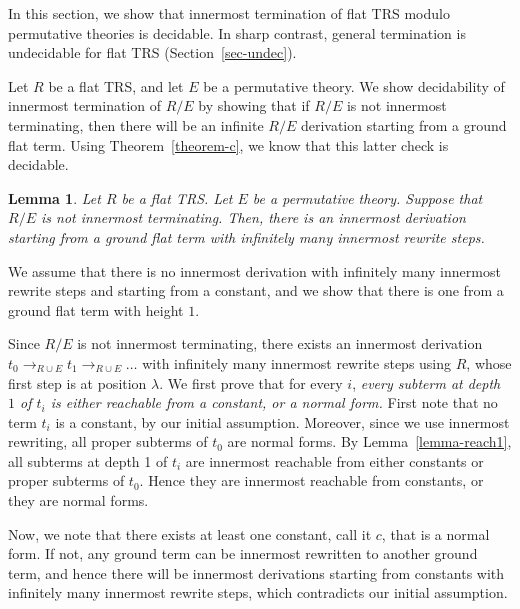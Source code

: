 \documentclass{LMCS}
\theoremstyle{plain}
\newtheorem{lemma}[thm]{Lemma}
\begin{document}
\noindent In this section, we show that innermost termination 
of flat TRS modulo permutative theories is decidable. In sharp contrast,
general termination is undecidable for 
flat TRS (Section~\ref{sec-undec}).

Let $R$ be a flat TRS, and let $E$ be a permutative theory.
We show decidability of innermost termination of
$R/E$ by showing that 
if $R/E$ is not innermost terminating, then
there will be an infinite $R/E$ derivation starting 
from a ground flat term.
Using Theorem~\ref{theorem-c}, we know that this latter 
check is decidable.

\begin{lemma}\label{lemma-flat-innermost}
Let $R$ be a flat TRS.
Let $E$ be a permutative theory.
Suppose that $R/E$ is not
innermost terminating. Then, there is an
innermost derivation starting from
a ground flat term with infinitely many innermost rewrite steps.
\end{lemma}
\proof
We assume that
there is no innermost derivation with infinitely many
innermost rewrite steps and starting from a constant, and we
show that there is one from a ground flat term with height $1$.

Since $R/E$ is not innermost terminating,
there exists an
innermost derivation
$t_0\rightarrow_{R\cup E} t_1\rightarrow_{R\cup E} \ldots$
with infinitely many innermost rewrite steps using $R$,
whose first step is at position $\lambda$. 
We first prove that for every $i$,
{\em every subterm at depth $1$ of $t_i$ is either
reachable from a constant, or a normal form.}
First note that no term
$t_i$ is a constant, by our initial assumption.
Moreover, since we use innermost rewriting,
all proper subterms of $t_0$ are normal forms. 
By Lemma~\ref{lemma-reach1}, all subterms at depth 1
of $t_i$ are innermost reachable from either constants or proper
subterms of $t_0$. Hence
they are innermost reachable from constants, or they are normal forms.

Now, we note that there exists at least one constant,
call it $c$, that is
a normal form.  If not, any ground term can be 
innermost rewritten to another ground term, and 
hence there will be innermost derivations starting from
constants with infinitely many innermost rewrite steps,
which contradicts our initial assumption.
\end{document}

